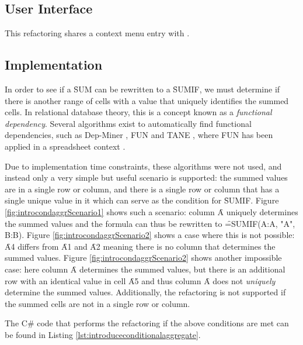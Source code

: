 \subsection{User Interface}

This refactoring shares a context menu entry with .

\subsection{Implementation}

In order to see if a \f{SUM} can be rewritten to a \f{SUMIF}, we must determine if there is another range of cells with a value that uniquely identifies the summed cells.
In relational database theory, this is a concept known as a \emph{functional dependency}.
Several algorithms exist to automatically find functional dependencies, such as Dep-Miner \cite{lopes2000efficient}, FUN \cite{novelli2001fun} and TANE \cite{huhtala1999tane}, where FUN has been applied in a spreadsheet context \cite{cunha2009spreadsheets}.

Due to implementation time constraints, these algorithms were not used, and instead only a very simple but useful scenario is supported: the summed values are in a single row or column, and there is a single row or column that has a single unique value in it which can serve as the condition for \f{SUMIF}.
Figure \ref{fig:introcondaggrScenario1} shows such a scenario: column \f{A} uniquely determines the summed values and the formula can thus be rewritten to \f{=SUMIF(A:A, "A", B:B)}.
Figure \ref{fig:introcondaggrScenario2} shows a case where this is not possible: \f{A4} differs from \f{A1} and \f{A2} meaning there is no column that determines the summed values.
Figure \ref{fig:introcondaggrScenario2} shows another impossible case: here column \f{A} determines the summed values, but there is an additional row with an identical value in cell \f{A5} and thus column \f{A} does not \emph{uniquely} determine the summed values.
Additionally, the refactoring is not supported if the summed cells are not in a single row or column.

The C\# code that performs the refactoring if the above conditions are met can be found in Listing \ref{lst:introduceconditionalaggregate}.

